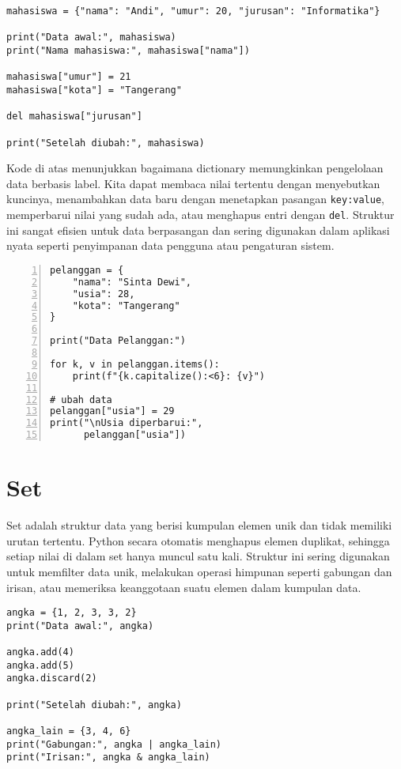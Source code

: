 \begin{lstlisting}[style=PythonStyle]
mahasiswa = {"nama": "Andi", "umur": 20, "jurusan": "Informatika"}

print("Data awal:", mahasiswa)
print("Nama mahasiswa:", mahasiswa["nama"])

mahasiswa["umur"] = 21
mahasiswa["kota"] = "Tangerang"

del mahasiswa["jurusan"]

print("Setelah diubah:", mahasiswa)
\end{lstlisting}

Kode di atas menunjukkan bagaimana dictionary memungkinkan pengelolaan data berbasis label. 
Kita dapat membaca nilai tertentu dengan menyebutkan kuncinya, 
menambahkan data baru dengan menetapkan pasangan \texttt{key:value}, 
memperbarui nilai yang sudah ada, atau menghapus entri dengan \texttt{del}. 
Struktur ini sangat efisien untuk data berpasangan dan sering digunakan dalam aplikasi nyata seperti penyimpanan data pengguna atau pengaturan sistem.

    \begin{lstlisting}[style=PythonStyle, numbers=left, firstnumber=1]
pelanggan = {
    "nama": "Sinta Dewi",
    "usia": 28,
    "kota": "Tangerang"
}

print("Data Pelanggan:")

for k, v in pelanggan.items():
    print(f"{k.capitalize():<6}: {v}")

# ubah data
pelanggan["usia"] = 29
print("\nUsia diperbarui:",
      pelanggan["usia"])
    \end{lstlisting}

\section{Set}
Set adalah struktur data yang berisi kumpulan elemen unik dan tidak memiliki urutan tertentu. 
Python secara otomatis menghapus elemen duplikat, sehingga setiap nilai di dalam set hanya muncul satu kali. 
Struktur ini sering digunakan untuk memfilter data unik, melakukan operasi himpunan seperti gabungan dan irisan, 
atau memeriksa keanggotaan suatu elemen dalam kumpulan data.

\begin{lstlisting}[style=PythonStyle]
angka = {1, 2, 3, 3, 2}
print("Data awal:", angka)

angka.add(4)
angka.add(5)
angka.discard(2)

print("Setelah diubah:", angka)

angka_lain = {3, 4, 6}
print("Gabungan:", angka | angka_lain)
print("Irisan:", angka & angka_lain)
\end{lstlisting}

